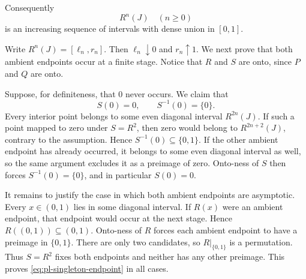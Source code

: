 \documentclass[11pt]{article}
\theoremstyle{definition}
\theoremstyle{remark}
\newcommand{\I}{[0,1]}
\begin{document}
Consequently
\begin{equation}\label{eq:pl-dense-diagonal}
 R^n(J)\quad(n\geq0)
\end{equation}
is an increasing sequence of intervals with dense union in \(\I\).

Write \(R^n(J)=[\ell_n,r_n]\).  Then
\(\ell_n\downarrow0\) and \(r_n\uparrow1\).  We next prove that both ambient
endpoints occur at a finite stage.  Notice that $R$ and $S$ are onto, since
$P$ and $Q$ are onto.

Suppose, for definiteness, that \(0\) never occurs.  We claim that
\begin{equation}\label{eq:pl-singleton-endpoint}
 S(0)=0,\qquad S^{-1}(0)=\{0\}.
\end{equation}
Every interior point belongs to some even diagonal interval
\(R^{2n}(J)\).  If such a point mapped to zero under \(S=R^2\), then zero
would belong to \(R^{2n+2}(J)\), contrary to the assumption.  Hence
$S^{-1}(0)\subseteq\{0,1\}$.  If the other ambient endpoint has already
occurred, it belongs to some even diagonal interval as well, so the same
argument excludes it as a preimage of zero.  Onto-ness of $S$ then forces
$S^{-1}(0)=\{0\}$, and in particular $S(0)=0$.

It remains to justify the case in which both ambient endpoints are
asymptotic.  Every \(x\in(0,1)\) lies in some diagonal interval.  If
\(R(x)\) were an ambient endpoint, that endpoint would occur at the next
stage.  Hence \(R((0,1))\subseteq(0,1)\).  Onto-ness of $R$ forces each
ambient endpoint to have a preimage in $\{0,1\}$.  There are only two
candidates, so $R|_{\{0,1\}}$ is a permutation.  Thus \(S=R^2\) fixes both
endpoints and neither has any other preimage.  This proves
\eqref{eq:pl-singleton-endpoint} in all cases.
\end{document}

